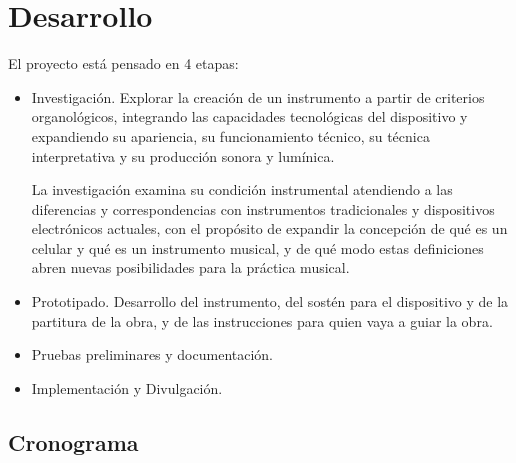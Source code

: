 \documentclass[spanish]{report}
\newcommand{\sectionsep}{1cm}
\begin{document}
\newpage
\vspace{\sectionsep}
\section{Desarrollo}
El proyecto está pensado en 4 etapas:
 \begin{itemize}
    \item Investigación.
    Explorar la creación de un instrumento a partir de criterios organológicos, integrando las capacidades tecnológicas del dispositivo y expandiendo su apariencia, su funcionamiento técnico, su técnica interpretativa y su producción sonora y lumínica.
    
    La investigación examina su condición instrumental atendiendo a las diferencias y correspondencias con instrumentos tradicionales y dispositivos electrónicos actuales, con el propósito de expandir la concepción de qué es un celular y qué es un instrumento musical, y de qué modo estas definiciones abren nuevas posibilidades para la práctica musical.

    \item Prototipado.
    Desarrollo del instrumento, del sostén para el dispositivo y de la partitura de la obra, y de las instrucciones para quien vaya a guiar la obra.

    \item Pruebas preliminares y documentación.

    \item Implementación y Divulgación.
 \end{itemize}

\vspace{\sectionsep}

\newpage
\subsection{Cronograma}
\end{document}
